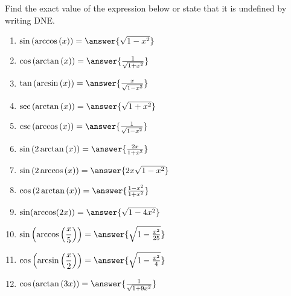 \documentclass{ximera}
\author{Carl Stitz \and Jeff Zeager \and Bart Snapp \and Matthew Carr}
\begin{document}
\begin{exercise}





Find the exact value of the expression below or state that it is undefined by writing DNE.
\begin{multicols}{2} 
  \begin{enumerate}
  \item $\sin \left( \arccos \left( x \right) \right)=\answer{\sqrt{1-x^2}}$ \label{rewritefirst}
  \item $\cos \left( \arctan \left( x \right) \right)=\answer{\frac{1}{\sqrt{1+x^2}}}$ 
  \item $\tan \left( \arcsin \left( x \right) \right)=\answer{\frac{x}{\sqrt{1-x^2}}}$ 
  \item $\sec \left( \arctan \left( x \right) \right)=\answer{\sqrt{1+x^2}}$ 
  \item $\csc \left( \arccos \left( x \right) \right)=\answer{\frac{1}{\sqrt{1-x^2}}}$ 
  \item $\sin \left( 2\arctan \left( x \right) \right)=\answer{\frac{2x}{1+x^2}}$ 
  \item $\sin \left( 2\arccos \left( x \right) \right)=\answer{2x\sqrt{1-x^2}}$ 
  \item $\cos \left( 2\arctan \left( x \right) \right)=\answer{\frac{1-x^2}{1+x^2}}$ 
  \item  $\sin(\arccos(2x))=\answer{\sqrt{1-4x^2}}$
  \item  $\sin\left(\arccos\left(\dfrac{x}{5}\right)\right)=\answer{\sqrt{1-\frac{x^2}{25}}}$
  \item  $\cos\left(\arcsin\left(\dfrac{x}{2}\right)\right)=\answer{\sqrt{1-\frac{x^2}{4}}}$
  \item  $\cos\left(\arctan\left(3x\right)\right)=\answer{\frac{1}{\sqrt{1+9x^2}}}$ 
  \end{enumerate}
\end{multicols}

\end{exercise}
\end{document}
